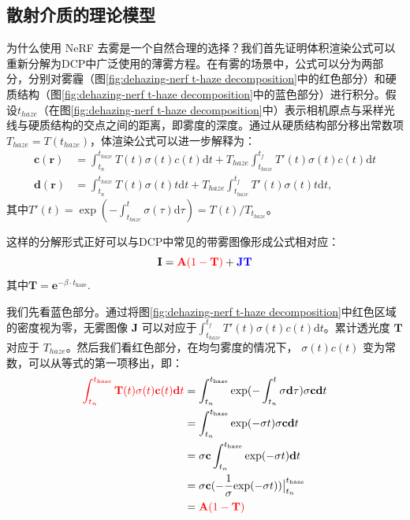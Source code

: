 \subsection{散射介质的理论模型}
为什么使用 NeRF 去雾是一个自然合理的选择？我们首先证明体积渲染公式可以重新分解为DCP\cite{kaiming_he_single_2009}中广泛使用的薄雾方程。在有雾的场景中，公式可以分为两部分，分别对雾霾（图\ref{fig:dehazing-nerf t-haze decomposition}中的红色部分）和硬质结构（图\ref{fig:dehazing-nerf t-haze decomposition}中的蓝色部分）进行积分。假设$t_{haze}$（在图\ref{fig:dehazing-nerf t-haze decomposition}中）表示相机原点与采样光线与硬质结构的交点之间的距离，即雾度的深度。通过从硬质结构部分移出常数项 $T_{haze} = T(t_{haze})$，体渲染公式可以进一步解释为：
\begin{align}
    \textbf{c}(\textbf{r}) &= \int_{t_n}^{t_{haze}}T(t)\sigma(t)c(t)\text{d}t + T_{haze}\int_{t_{haze}}^{t_f}T'(t)\sigma(t)c(t)\text{d}t\\
    \textbf{d}(\textbf{r}) &= \int_{t_n}^{t_{haze}}T(t)\sigma(t)t\text{d}t + T_{haze}\int_{t_{haze}}^{t_f}T'(t)\sigma(t)t\text{d}t,
\end{align}
其中$T'(t)=\exp(-\int_{t_{haze}}^{t}\sigma(\tau)\text{d}\tau)=T(t)/T_{t_{haze}}$。

这样的分解形式正好可以与DCP中常见的带雾图像形成公式相对应：
\begin{equation}
    \mathbf{I}= \textcolor{red}{\mathbf{A} (1-\mathbf{T})} + \textcolor{blue}{\mathbf{J} \mathbf{T}}
\end{equation}
其中$\mathbf{T}=\mathbf{e}^{-\beta \cdot t_\text{haze}}$.

我们先看蓝色部分。通过将图\ref{fig:dehazing-nerf t-haze decomposition}中红色区域的密度视为零，无雾图像 $\mathbf{J}$ 可以对应于$\int_{t_{haze}}^{t_f}T'(t)\sigma(t)c(t)\text{d}t$。累计透光度 $\mathbf{T}$ 对应于 ${T_{haze}}$。然后我们看红色部分，在均匀雾度的情况下， $σ(t)c(t)$ 变为常数，可以从等式的第一项移出，即：
\begin{align}
    \textcolor{red}{\int_{t_n}^{{t}_\text{haze}}\mathbf{T}(t){{\sigma}}(t){\mathbf{c}}(t)\mathbf{d}t} &= \int_{t_n}^{t_\text{haze}} \text{exp}(-\int_{t_n}^t {\sigma}\mathbf{d}\tau) {\sigma}{\mathbf{c}}\mathbf{d}t \\
    &=\int_{t_n}^{t_\text{haze}} \text{exp}(-{\sigma}t) {\sigma}{\mathbf{c}}\mathbf{d}t \\
    &={\sigma}{\mathbf{c}}\int_{t_n}^{t_\text{haze}} \text{exp}(-{\sigma}t) \mathbf{d}t \\
    &={\sigma}{\mathbf{c}}(-\frac{1}{{\sigma}}\text{exp}(-{\sigma}t))\big|_{t_n}^{t_\text{haze}} \\
    &=\textcolor{red}{\mathbf{A}(1-\mathbf{T})}
\end{align}

